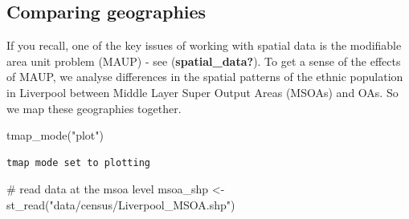 \documentclass[
  letterpaper,
  DIV=11,
  numbers=noendperiod,
  oneside]{scrreprt}
\newenvironment{Shaded}{\begin{snugshade}}{\end{snugshade}}
\newcommand{\CommentTok}[1]{\textcolor[rgb]{0.37,0.37,0.37}{#1}}
\newcommand{\FunctionTok}[1]{\textcolor[rgb]{0.28,0.35,0.67}{#1}}
\newcommand{\NormalTok}[1]{\textcolor[rgb]{0.00,0.23,0.31}{#1}}
\newcommand{\OtherTok}[1]{\textcolor[rgb]{0.00,0.23,0.31}{#1}}
\newcommand{\StringTok}[1]{\textcolor[rgb]{0.13,0.47,0.30}{#1}}
\begin{document}
\subsection{Comparing geographies}\label{comparing-geographies}

If you recall, one of the key issues of working with spatial data is the
modifiable area unit problem (MAUP) - see (\textbf{spatial\_data?}). To
get a sense of the effects of MAUP, we analyse differences in the
spatial patterns of the ethnic population in Liverpool between Middle
Layer Super Output Areas (MSOAs) and OAs. So we map these geographies
together.


\begin{Shaded}
\begin{Highlighting}[]
\FunctionTok{tmap\_mode}\NormalTok{(}\StringTok{"plot"}\NormalTok{)}
\end{Highlighting}
\end{Shaded}

\begin{verbatim}
tmap mode set to plotting
\end{verbatim}

\begin{Shaded}
\begin{Highlighting}[]
\CommentTok{\# read data at the msoa level}
\NormalTok{msoa\_shp }\OtherTok{\textless{}{-}} \FunctionTok{st\_read}\NormalTok{(}\StringTok{"data/census/Liverpool\_MSOA.shp"}\NormalTok{)}
\end{Highlighting}
\end{Shaded}
\end{document}
